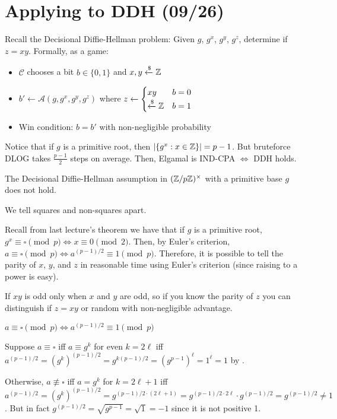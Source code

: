 \documentclass[notes]{agony}
\newcommand{\xgets}{\xleftarrow}
\begin{document}
\section{Applying to DDH (09/26)}

Recall the Decisional Diffie-Hellman problem:
Given $g$, $g^x$, $g^y$, $g^z$, determine if $z = xy$. Formally, as a game:
\begin{itemize}[nosep]
  \item $\mathcal C$ chooses a bit $b \in \{0,1\}$ and $x,y \xgets{\$}\Z$
  \item $b' \gets \mathcal A(g, g^x, g^y, g^z)$ where $z \gets \begin{cases}xy & b = 0 \\ \xgets{\$}\Z & b = 1\end{cases}$
  \item Win condition: $b = b'$ with non-negligible probability
\end{itemize}
Notice that if $g$ is a primitive root, then $\abs{\{g^x : x \in \mathbb{Z}\}}=p-1$.
But bruteforce DLOG takes $\frac{p-1}{2}$ steps on average.
Then, Elgamal is IND-CPA $\iff$ DDH holds.

\begin{prop}
  The Decisional Diffie-Hellman assumption in $(\mathbb{Z}/p\mathbb{Z})^\times$
  with a primitive base $g$ does not hold.
\end{prop}
\begin{prf}
  We tell squares and non-squares apart.

  Recall from last lecture's theorem we have that if $g$ is a primitive root,
  $g^x \equiv \square \pmod p \iff x \equiv 0 \pmod 2$.
  Then, by Euler's criterion, $a \equiv \square \pmod p \iff a^{(p-1)/2} \equiv 1 \pmod p$.
  Therefore, it is possible to tell the parity of $x$, $y$, and $z$
  in reasonable time using Euler's criterion (since raising to a power is easy).

  If $xy$ is odd only when $x$ and $y$ are odd,
  so if you know the parity of $z$ you can distinguish if $z=xy$
  or random with non-negligible advantage.
\end{prf}

\begin{prop}
  $a \equiv \square \pmod p \iff a^{(p-1)/2} \equiv 1 \pmod p$
\end{prop}
\begin{prf}
  Suppose $a \equiv \square$ iff $a \equiv g^k$ for even $k=2\ell$
  iff $a^{(p-1)/2} = (g^k)^{(p-1)/2} = g^{k(p-1)/2}=(g^{p-1})^\ell=1^\ell=1$ by \FLT{}.

  Otherwise, $a \not\equiv \square$ iff $a = g^k$ for $k=2\ell+1$
  iff $a^{(p-1)/2} = (g^k)^{(p-1)/2} = g^{(p-1)/2 \cdot (2\ell+1)}=g^{(p-1)/2\cdot 2\ell}\cdot g^{(p-1)/2} = g^{(p-1)/2} \neq 1$.
  But in fact $g^{(p-1)/2} = \sqrt{g^{p-1}} = \sqrt{1} = -1$ since it is not positive 1.
\end{prf}
\end{document}
